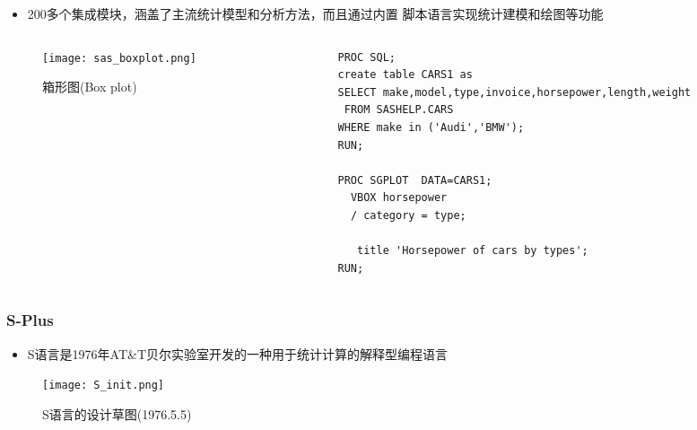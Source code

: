 \begin{frame}[t, fragile]{\subsecname}{\subsubsecname}
  \begin{itemize}
    \item 200多个集成模块，涵盖了主流统计模型和分析方法，而且通过内置
           脚本语言实现统计建模和绘图等功能
  \end{itemize}
 
      \begin{columns}
        \begin{column}[c]{.5\textwidth}
          \centering 
          \begin{figure}
            \texttt{[image: sas\_boxplot.png]}
            \caption{箱形图(Box plot)}
          \end{figure}
        \end{column}

        \begin{column}[c]{.5\textwidth}\centering
\begin{lstlisting}[language=SAS]
PROC SQL;
create table CARS1 as
SELECT make,model,type,invoice,horsepower,length,weight
 FROM SASHELP.CARS
WHERE make in ('Audi','BMW');
RUN;

PROC SGPLOT  DATA=CARS1;
  VBOX horsepower 
  / category = type;

   title 'Horsepower of cars by types';
RUN; 
\end{lstlisting}
        \end{column}
      \end{columns}
\end{frame}

\subsubsection{S-Plus}
\begin{frame}[t]{\subsecname}{\subsubsecname}
    \begin{itemize}
      \item S语言是1976年AT\&T贝尔实验室开发的一种用于统计计算的解释型编程语言
    \end{itemize}

    \begin{figure}
      \centering \texttt{[image: S\_init.png]}
      \caption{S语言的设计草图(1976.5.5)}
    \end{figure}

\end{frame}   

